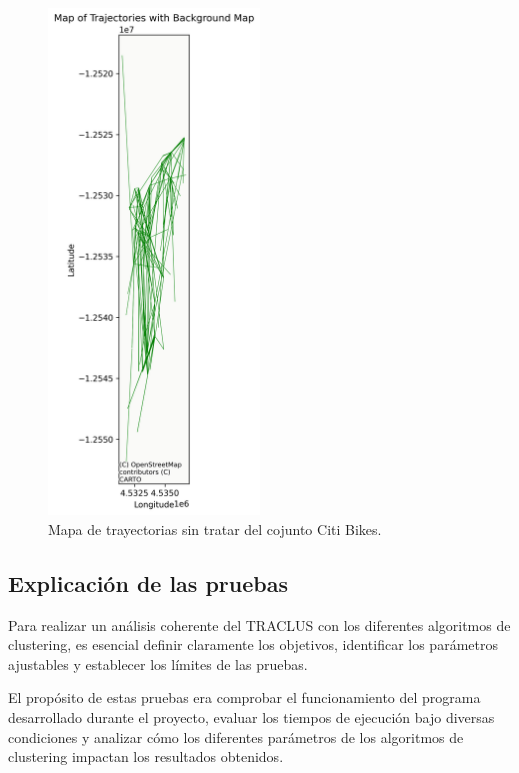 \begin{figure}[h!]
    \centering
    \includegraphics[width=0.5\textwidth]{img/CitiBike_trayectories.png}
    \caption{Mapa de trayectorias sin tratar del cojunto Citi Bikes.}
    \label{fig:clusters_Spectral}
\end{figure}

\subsection{Explicación de las pruebas}

Para realizar un análisis coherente del TRACLUS con los diferentes algoritmos de clustering, es esencial definir claramente los objetivos, identificar los parámetros ajustables y establecer los límites de las pruebas. 

El propósito de estas pruebas era comprobar el funcionamiento del programa desarrollado durante el proyecto, evaluar los tiempos de ejecución bajo diversas condiciones y analizar cómo los diferentes parámetros de los algoritmos de clustering impactan los resultados obtenidos.

